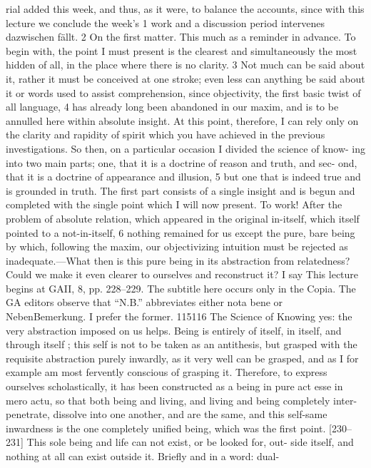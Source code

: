 rial added this week, and thus, as it were, to balance the accounts, since with
this lecture we conclude the week’s 1 work and a discussion period intervenes
{dazwischen fällt}. 2
On the first matter. This much as a reminder in advance. To begin with,
the point I must present is the clearest and simultaneously the most hidden of
all, in the place where there is no clarity. 3 Not much can be said about it, rather
it must be conceived at one stroke; even less can anything be said about it or
words used to assist comprehension, since objectivity, the first basic twist of all
language, 4 has already long been abandoned in our maxim, and is to be
annulled here within absolute insight. At this point, therefore, I can rely only
on the clarity and rapidity of spirit which you have achieved in the previous
investigations. So then, on a particular occasion I divided the science of know-
ing into two main parts; one, that it is a doctrine of reason and truth, and sec-
ond, that it is a doctrine of appearance and illusion, 5 but one that is indeed true
and is grounded in truth. The first part consists of a single insight and is begun
and completed with the single point which I will now present. To work! After
the problem of absolute relation, which appeared in the original in-itself, which
itself pointed to a not-in-itself, 6 nothing remained for us except the pure, bare
being by which, following the maxim, our objectivizing intuition must be
rejected as inadequate.—What then is this pure being in its abstraction from
relatedness? Could we make it even clearer to ourselves and reconstruct it? I say
This lecture begins at GAII, 8, pp. 228–229. The subtitle here occurs only in the Copia.
The GA editors observe that “N.B.” abbreviates either nota bene or NebenBemerkung. I
prefer the former.
115116
The Science of Knowing
yes: the very abstraction imposed on us helps. Being is entirely of itself, in itself,
and through itself ; this self is not to be taken as an antithesis, but grasped with
the requisite abstraction purely inwardly, as it very well can be grasped, and as
I for example am most fervently conscious of grasping it. Therefore, to express
ourselves scholastically, it has been constructed as a being in pure act {esse in
mero actu}, so that both being and living, and living and being completely inter-
penetrate, dissolve into one another, and are the same, and this self-same
inwardness is the one completely unified being, which was the first point.
[230–231] This sole being and life can not exist, or be looked for, out-
side itself, and nothing at all can exist outside it. Briefly and in a word: dual-
